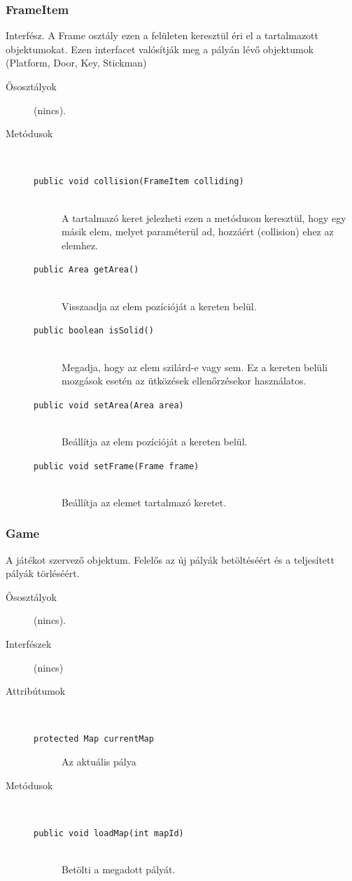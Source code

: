 		\subsubsection{FrameItem} Interfész.
				 A Frame osztály ezen a felületen keresztül éri el a tartalmazott objektumokat.   Ezen interfacet valósítják meg a pályán lévő objektumok (Platform, Door, Key, Stickman) 			\begin{description}


				\item[Ősosztályok] (nincs).
				\item[Metódusok]$\ $
					\begin{description}
						\item[\texttt{public void collision(FrameItem colliding)}] \hfill \\ A tartalmazó keret jelezheti ezen a metóduson keresztül,  hogy egy másik elem, melyet paraméterül ad,  hozzáért (collision) ehez az elemhez. 
						\item[\texttt{public Area getArea()}] \hfill \\ Visszaadja az elem pozícióját a kereten belül. 
						\item[\texttt{public boolean isSolid()}] \hfill \\ Megadja, hogy az elem szilárd-e vagy sem.  Ez a kereten belüli mozgások esetén az  ütközések ellenőrzésekor használatos. 
						\item[\texttt{public void setArea(Area area)}] \hfill \\ Beállítja az elem pozícióját a kereten belül. 
						\item[\texttt{public void setFrame(Frame frame)}] \hfill \\ Beállítja az elemet tartalmazó keretet. 
					\end{description}
			\end{description}

		\subsubsection{Game}
				 A játékot szervező objektum. Felelős az új pályák betöltéséért és a teljesített pályák törléséért. 			\begin{description}


				\item[Ősosztályok] (nincs).
				\item[Interfészek] (nincs)
				\item[Attribútumok]$\ $
					\begin{description}
						\item[\texttt{protected Map currentMap}] Az aktuális pálya 
					\end{description}
				\item[Metódusok]$\ $
					\begin{description}
						\item[\texttt{public void loadMap(int mapId)}] \hfill \\ Betölti a megadott pályát. 
					\end{description}
			\end{description}

